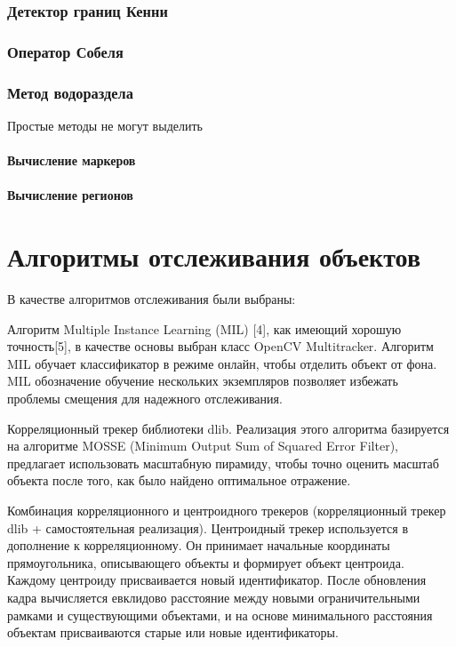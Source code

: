 \documentclass[specification,annotation,times]{itmo-student-thesis}
\begin{document}
\subsection{Детектор границ Кенни}
\subsection{Оператор Собеля}
\subsection{Метод водораздела}
Простые методы не могут выделить 
\subsubsection{Вычисление маркеров}
\subsubsection{Вычисление регионов}

\chapterconclusion


\chapter{Алгоритмы отслеживания объектов}
В качестве алгоритмов отслеживания были выбраны:

Алгоритм  Multiple Instance Learning (MIL) [4], как имеющий хорошую точность[5], в качестве основы выбран класс OpenCV Multitracker. Алгоритм MIL обучает классификатор в режиме онлайн, чтобы отделить объект от фона. MIL обозначение обучение нескольких экземпляров позволяет избежать проблемы смещения для надежного отслеживания.

Корреляционный трекер библиотеки dlib. Реализация этого алгоритма базируется на алгоритме MOSSE (Minimum Output Sum of Squared Error Filter), предлагает использовать масштабную пирамиду, чтобы точно оценить масштаб объекта после того, как было найдено оптимальное отражение. 

Комбинация корреляционного и центроидного трекеров (корреляционный трекер dlib + самостоятельная реализация). Центроидный трекер  используется в дополнение к корреляционному. Он принимает начальные координаты прямоугольника, описывающего объекты и формирует объект центроида. Каждому центроиду присваивается новый идентификатор. После обновления кадра вычисляется евклидово расстояние между новыми ограничительными рамками и существующими объектами, и на основе минимального расстояния объектам присваиваются старые или новые идентификаторы.
\end{document}
